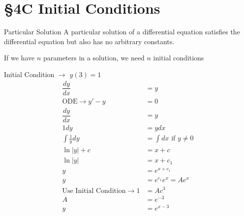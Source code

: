 \section{\S 4C Initial Conditions}
\begin{imp:defn}{Particular Solution}{} A particular solution of a differential equation satisfies the differential equation but also has no arbitrary constants.
\end{imp:defn}
\begin{note}
If we have $n$ parameters in a solution, we need $n$ initial conditions
\end{note}
\begin{ex}
Initial Condition $\rightarrow$ $y \left( 3 \right) =1$\\
\begin{align*}
    \dfrac{dy}{dx} & = y \\
    \text{ODE} \rightarrow y'-y & = 0\\
    \dfrac{dy}{dx} & =y\\
    1dy&= ydx\\
    \int \frac{1}{y}dy &=\int dx \text{ if } y\neq 0\\
    \ln \left| y \right| +c &=x+c\\
    \ln \left| y \right| &=x+c_1\\
    y &=e^{x+c_1}\\
    y &=e^{c_1}e^x=Ae^x\\
    \text{Use Initial Condition} \rightarrow 1&=Ac^3\\
    A &=e^{-3}\\
    y &= e^{x-3}
\end{align*}
\end{ex}
